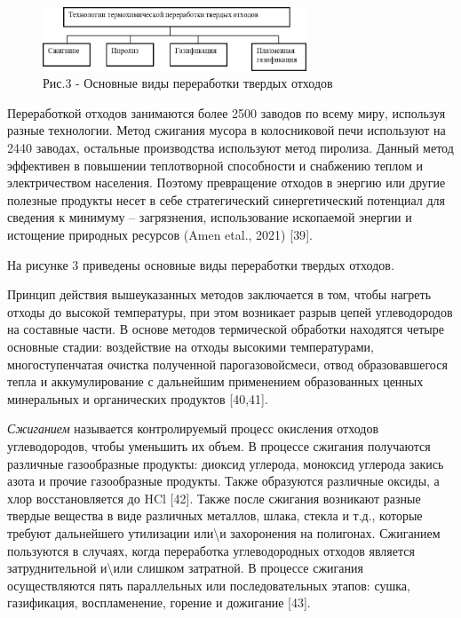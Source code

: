\begin{figure}[H]
	\centering
	\includegraphics[width=0.7\textwidth]{media/chem4/image12}
	\caption*{Рис.3 - Основные виды переработки твердых отходов}
\end{figure}

\begin{multicols}{2}
Переработкой отходов занимаются более 2500 заводов по всему миру,
используя разные технологии. Метод сжигания мусора в колосниковой печи
используют на 2440 заводах, остальные производства используют метод
пиролиза. Данный метод эффективен в повышении теплотворной способности и
снабжению теплом и электричеством населения. Поэтому превращение отходов
в энергию или другие полезные продукты несет в себе стратегический
синергетический потенциал для сведения к минимуму -- загрязнения,
использование ископаемой энергии и истощение природных ресурсов (Amen
etal., 2021) {[}39{]}.

На рисунке 3 приведены основные виды переработки твердых отходов.

Принцип действия вышеуказанных методов заключается в том, чтобы нагреть
отходы до высокой тем­пературы, при этом возникает разрыв цепей
углеводо­родов на составные части. В основе методов термической обработки
находятся четыре основные стадии: воздей­ствие на отходы высокими
температура­ми, многоступенчатая очистка полученной парогазовойсмеси,
отвод образовавшегося тепла и аккумулирование с дальнейшим применением
образованных ценных мине­ральных и органических продуктов {[}40,41{]}.

\emph{Сжиганием} называется контролируемый процесс окисления отходов
углеводородов, чтобы уменьшить их объем. В процессе сжигания получаются
различные газо­образные продукты: диоксид углерода, моноксид углеро­да
закись азота и прочие газообразные продукты. Также образуются различные
оксиды, а хлор восстановляется до HCl {[}42{]}. Также после сжигания
возникают разные твердые вещества в виде различных металлов, шлака,
стекла и т.д., которые требуют дальнейшего утилизации
или\textbackslash и захо­ронения на полигонах. Сжиганием пользуются в
случаях, когда переработка углеводородных отходов является
затруднительной и\textbackslash или слишком затратной. В процессе
сжигания осуществляются пять парал­лельных или последовательных этапов:
сушка, газифи­кация, воспламенение, горение и дожигание {[}43{]}.


\end{multicols}
